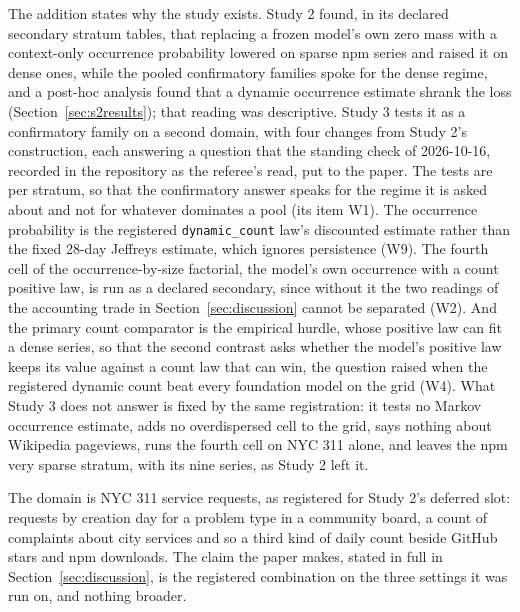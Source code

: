 The addition states why the study exists. Study 2 found, in its declared secondary stratum tables, that
replacing a frozen model's own zero mass with a context-only occurrence probability lowered \qs{} on
sparse npm series and raised it on dense ones, while the pooled confirmatory families spoke for the dense
regime, and a post-hoc analysis found that a dynamic occurrence estimate shrank the loss
(Section~\ref{sec:s2results}); that reading was descriptive. Study 3 tests it as a confirmatory family on
a second domain, with four changes from Study 2's construction, each answering a question that the
standing check of 2026-10-16, recorded in the repository as the referee's read, put to the paper. The tests
are per stratum, so that the confirmatory answer speaks for the regime it is asked about and not for
whatever dominates a pool (its item W1). The occurrence probability is the registered
\texttt{dynamic\_count} law's discounted estimate rather than the fixed 28-day Jeffreys estimate, which
ignores persistence (W9). The fourth cell of the occurrence-by-size factorial, the model's own occurrence
with a count positive law, is run as a declared secondary, since without it the two readings of the
accounting trade in Section~\ref{sec:discussion} cannot be separated (W2). And the primary count comparator
is the empirical hurdle, whose positive law can fit a dense series, so that the second contrast asks
whether the model's positive law keeps its value against a count law that can win, the question raised when
the registered dynamic count beat every foundation model on the grid (W4). What Study 3 does not answer is
fixed by the same registration: it tests no Markov occurrence estimate, adds no overdispersed cell to the
grid, says nothing about Wikipedia pageviews, runs the fourth cell on NYC 311 alone, and leaves the npm very
sparse stratum, with its nine series, as Study 2 left it.

The domain is NYC 311 service requests, as registered for Study 2's deferred slot: requests by creation day
for a problem type in a community board, a count of complaints about city services and so a third kind of
daily count beside GitHub stars and npm downloads. The claim the paper makes, stated in full in
Section~\ref{sec:discussion}, is the registered combination on the three settings it was run on, and
nothing broader.
